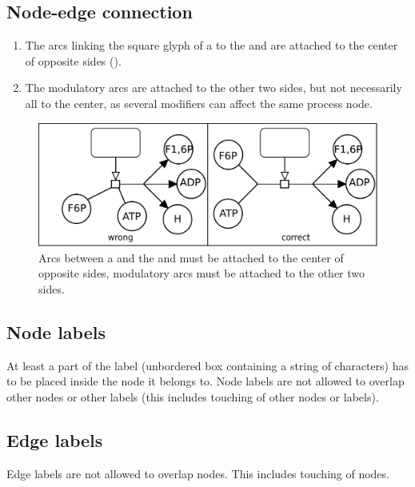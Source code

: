 \subsection{Node-edge connection}

\begin{enumerate}
\item The arcs linking the square glyph of a  to the  and 
 are attached to the center of opposite sides ().
\item The modulatory arcs are attached to the other two sides, but not necessarily all to the center, as several modifiers can affect the same process node.
\end{enumerate}

\begin{figure}[htb]
  \centering
  \includegraphics[scale=0.3]{images/layout-connecting-arcs}
  \caption{Arcs between a   and the  and  must be attached to the center of opposite sides, modulatory
  arcs must be attached to the other two sides.}\label{fig:layout6}
\end{figure}

\subsection{Node labels}

At least a part of the label (unbordered box containing a string of characters) has to be placed inside the node it belongs to. Node labels are not allowed to overlap other nodes or other labels (this includes touching of other nodes or labels).

\subsection{Edge labels}

Edge labels are not allowed to overlap nodes. This includes touching
of nodes.


